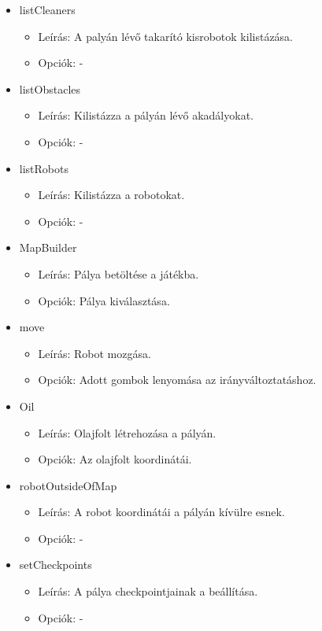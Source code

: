 \begin{itemize}
\item listCleaners
	\begin{itemize}
	\item Leírás: A palyán lévő takarító kisrobotok kilistázása.
	\item Opciók: -
	\end{itemize}
	
\item listObstacles
	\begin{itemize}
	\item Leírás: Kilistázza a pályán lévő akadályokat.
	\item Opciók: -
	\end{itemize}
	
\item listRobots
	\begin{itemize}
	\item Leírás: Kilistázza a robotokat.
	\item Opciók: -
	\end{itemize}
	
\item MapBuilder
	\begin{itemize}
	\item Leírás: Pálya betöltése a játékba.
	\item Opciók: Pálya kiválasztása.
	\end{itemize}
	
\item move
	\begin{itemize}
	\item Leírás: Robot mozgása.
	\item Opciók: Adott gombok lenyomása az irányváltoztatáshoz.
	\end{itemize}
	
\item Oil
	\begin{itemize}
	\item Leírás: Olajfolt létrehozása a pályán.
	\item Opciók: Az olajfolt koordinátái.
	\end{itemize}
	
\item robotOutsideOfMap
	\begin{itemize}
	\item Leírás: A robot koordinátái a pályán kívülre esnek.
	\item Opciók: -
	\end{itemize}
	
\item setCheckpoints
	\begin{itemize}
	\item Leírás: A pálya checkpointjainak a beállítása.
	\item Opciók: -
	\end{itemize}

\end{itemize}

